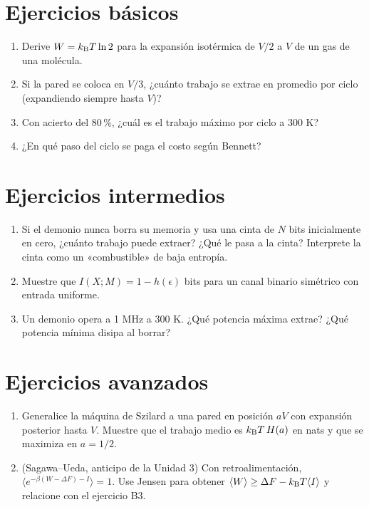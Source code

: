 \documentclass[11pt,a4paper]{article}
\begin{document}

\section{Ejercicios básicos}
\begin{enumerate}[label=\textbf{B\arabic*.}]
\item Derive $W=k_{\mathrm B} T\ln2$ para la expansión isotérmica de $V/2$ a $V$ de un gas de una molécula.
\item Si la pared se coloca en $V/3$, ¿cuánto trabajo se extrae en promedio por ciclo (expandiendo siempre hasta $V$)?
\item Con acierto del 80\,\%, ¿cuál es el trabajo máximo por ciclo a 300 K?
\item ¿En qué paso del ciclo se paga el costo según Bennett?
\end{enumerate}

\section{Ejercicios intermedios}
\begin{enumerate}[label=\textbf{I\arabic*.}]
\item Si el demonio nunca borra su memoria y usa una cinta de $N$ bits inicialmente en cero, ¿cuánto trabajo puede extraer? ¿Qué le pasa a la cinta? Interprete la cinta como un «combustible» de baja entropía.
\item Muestre que $I(X;M)=1-h(\epsilon)$ bits para un canal binario simétrico con entrada uniforme.
\item Un demonio opera a 1 MHz a 300 K. ¿Qué potencia máxima extrae? ¿Qué potencia mínima disipa al borrar?
\end{enumerate}

\section{Ejercicios avanzados}
\begin{enumerate}[label=\textbf{A\arabic*.}]
\item Generalice la máquina de Szilard a una pared en posición $aV$ con expansión posterior hasta $V$. Muestre que el trabajo medio es $k_{\mathrm B} T\,H(a)$ en nats y que se maximiza en $a=1/2$.
\item (Sagawa--Ueda, anticipo de la Unidad 3) Con retroalimentación, $\langle e^{-\beta(W-\Delta F)-I}\rangle=1$. Use Jensen para obtener $\langle W\rangle\ge\Delta F-k_{\mathrm B} T\langle I\rangle$ y relacione con el ejercicio B3.
\end{enumerate}
\end{document}
